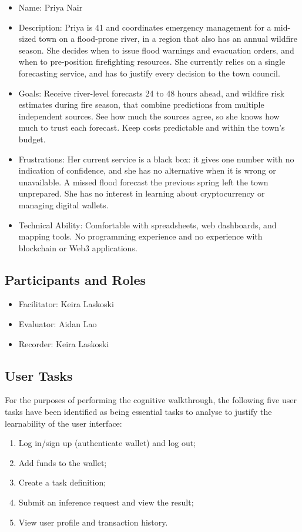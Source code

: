 \documentclass{article}
\begin{document}
\begin{itemize}
\item Name: Priya Nair
\item Description: Priya is 41 and coordinates emergency management for a mid-sized town on a flood-prone river, in a region that also has an annual wildfire season. She decides when to issue flood warnings and evacuation orders, and when to pre-position firefighting resources. She currently relies on a single forecasting service, and has to justify every decision to the town council.
\item Goals: Receive river-level forecasts 24 to 48 hours ahead, and wildfire risk estimates during fire season, that combine predictions from multiple independent sources. See how much the sources agree, so she knows how much to trust each forecast. Keep costs predictable and within the town's budget.
\item Frustrations: Her current service is a black box: it gives one number with no indication of confidence, and she has no alternative when it is wrong or unavailable. A missed flood forecast the previous spring left the town unprepared. She has no interest in learning about cryptocurrency or managing digital wallets.
\item Technical Ability: Comfortable with spreadsheets, web dashboards, and mapping tools. No programming experience and no experience with blockchain or Web3 applications.
\end{itemize}


\subsection{Participants and Roles}
\begin{itemize}
\item Facilitator: Keira Laskoski
\item Evaluator: Aidan Lao
\item Recorder: Keira Laskoski
\end{itemize}

\subsection{User Tasks}
For the purposes of performing the cognitive walkthrough, the following five user tasks have been identified as being essential tasks to analyse to justify the learnability of the user interface:
\begin{enumerate}
\item Log in/sign up (authenticate wallet) and log out;
\item Add funds to the wallet;
\item Create a task definition;
\item Submit an inference request and view the result;
\item View user profile and transaction history.
\end{enumerate}
\end{document}
